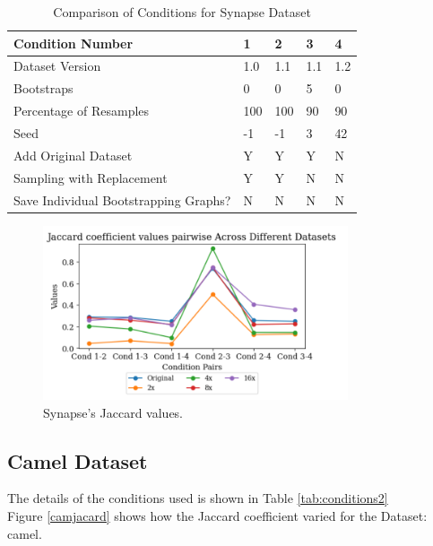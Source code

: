 \documentclass[sigconf,review,anonymous,nonacm=true]{acmart}
\begin{document}
\begin{table}[h]
\centering
\caption{Comparison of Conditions for Synapse Dataset}
\label{tab:conditions}
\begin{tabularx}{0.5\textwidth}{|l|X|X|X|X|}
\hline
\textbf{Condition Number}                     & \textbf{1} & \textbf{2} & \textbf{3} & \textbf{4} \\ \hline
Dataset Version                      & 1.0          & 1.1          & 1.1          & 1.2          \\ \hline
Bootstraps                   & 0                    & 0                    & 5                    & 0                    \\ \hline
Percentage of Resamples     & 100                & 100               & 90                & 90                 \\ \hline
Seed                          & -1                   & -1                   & 3                    & 42                   \\ \hline
Add Original Dataset          & Y                    & Y                    & Y                    & N                    \\ \hline
Sampling with Replacement     & Y                    & Y                    & N                    & N                    \\ \hline
Save Individual Bootstrapping Graphs? & N                    & N                    & N                    & N                    \\ \hline
\end{tabularx}
\end{table}

\begin{figure}[h]
\caption{Synapse's Jaccard values.}\label{synjacard}
\includegraphics[width=9cm]{images/First_Pic.png}
\end{figure}

\subsection{Camel Dataset}
The details of the conditions used is shown in Table \ref{tab:conditions2}\\
Figure \ref{camjacard} shows how the Jaccard coefficient varied for the Dataset: camel. 
\end{document}
